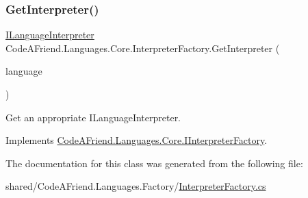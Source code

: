\subsubsection{\texorpdfstring{Get\+Interpreter()}{GetInterpreter()}}
{\footnotesize\ttfamily \mbox{\hyperlink{interface_code_a_friend_1_1_data_model_1_1_i_language_interpreter}{I\+Language\+Interpreter}} Code\+A\+Friend.\+Languages.\+Core.\+Interpreter\+Factory.\+Get\+Interpreter (\begin{DoxyParamCaption}\item[{\mbox{\hyperlink{namespace_code_a_friend_1_1_data_model_a13e088c525db1b03a4de75420ced79b2}{Supported\+Language}}}]{language }\end{DoxyParamCaption})}



Get an appropriate I\+Language\+Interpreter.  



Implements \mbox{\hyperlink{interface_code_a_friend_1_1_languages_1_1_core_1_1_i_interpreter_factory_a4d2f3ae695515fc3c28f352a20bfd601}{Code\+A\+Friend.\+Languages.\+Core.\+I\+Interpreter\+Factory}}.



The documentation for this class was generated from the following file\+:\begin{DoxyCompactItemize}
\item 
shared/\+Code\+A\+Friend.\+Languages.\+Factory/\mbox{\hyperlink{_interpreter_factory_8cs}{Interpreter\+Factory.\+cs}}\end{DoxyCompactItemize}
